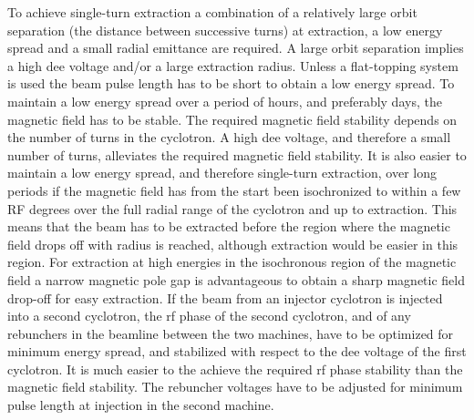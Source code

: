 \documentclass[11pt]{report}
\begin{document}
To achieve single-turn extraction a combination of a relatively large orbit separation (the distance between successive turns) at extraction, a low energy spread and a small radial emittance are required. A large orbit separation implies a high dee voltage and/or a large extraction radius.  Unless a flat-topping system is used the beam pulse length has to be short to obtain a low energy spread. To maintain a low energy spread over a period of hours, and preferably days, the magnetic field has to be stable. The required magnetic field stability depends on the number of turns in the cyclotron. A high dee voltage, and therefore a small number of turns, alleviates the required magnetic field stability. It is also easier to maintain a low energy spread, and therefore single-turn extraction, over long periods if the magnetic field has from the start been isochronized to within a few RF degrees over the full radial range of the cyclotron and up to extraction. This means that the beam has to be extracted before the 
region where the magnetic field drops off with radius is reached, although extraction would be easier in this region. For extraction at high energies in the isochronous region of the magnetic field a narrow magnetic pole gap is advantageous to obtain a sharp magnetic field drop-off for easy extraction. If the beam from an injector cyclotron is injected into a second cyclotron, the rf phase of the second cyclotron, and of any rebunchers in the beamline between the two machines, have to be optimized for minimum energy spread, and stabilized with respect to the dee voltage of the first cyclotron. It is much easier to the achieve the required rf phase stability than the magnetic field stability. The rebuncher voltages have to be adjusted for minimum pulse length at injection in the second machine.
\end{document}
